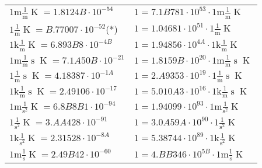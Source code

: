 \begin{center}
\begin{longtable}{l l}
{\color{gray}$1 \bm{\mathrm{ m}}\frac1{\operatorname{m}}{}{}{\operatorname{K}} = 1.8124B\cdot10^{-54} $}   & {\color{gray}$ 1 = 7.1B781\cdot10^{53} \cdot 1 \bm{\mathrm{ m}}\frac1{\operatorname{m}}{}{}{\operatorname{K}}$}  \\
{\color{black}$1 \bm{\mathrm{ }}\frac1{\operatorname{m}}{}{}{\operatorname{K}} = B.77007\cdot10^{-52} $}\quad(*) & {\color{black}$ 1 = 1.04681\cdot10^{51} \cdot 1 \bm{\mathrm{ }}\frac1{\operatorname{m}}{}{}{\operatorname{K}}$}  \\
{\color{gray}$1 \bm{\mathrm{ k}}\frac1{\operatorname{m}}{}{}{\operatorname{K}} = 6.893B8\cdot10^{-4B} $}   & {\color{gray}$ 1 = 1.94856\cdot10^{4A} \cdot 1 \bm{\mathrm{ k}}\frac1{\operatorname{m}}{}{}{\operatorname{K}}$}  \\
{\color{gray}$1 \bm{\mathrm{ m}}\frac1{\operatorname{m}}{\operatorname{s}}{}{\operatorname{K}} = 7.1A50B\cdot10^{-21} $}   & {\color{gray}$ 1 = 1.8159B\cdot10^{20} \cdot 1 \bm{\mathrm{ m}}\frac1{\operatorname{m}}{\operatorname{s}}{}{\operatorname{K}}$}  \\
{\color{black}$1 \bm{\mathrm{ }}\frac1{\operatorname{m}}{\operatorname{s}}{}{\operatorname{K}} = 4.18387\cdot10^{-1A} $}   & {\color{black}$ 1 = 2.A9353\cdot10^{19} \cdot 1 \bm{\mathrm{ }}\frac1{\operatorname{m}}{\operatorname{s}}{}{\operatorname{K}}$}  \\
{\color{gray}$1 \bm{\mathrm{ k}}\frac1{\operatorname{m}}{\operatorname{s}}{}{\operatorname{K}} = 2.49106\cdot10^{-17} $}   & {\color{gray}$ 1 = 5.010A3\cdot10^{16} \cdot 1 \bm{\mathrm{ k}}\frac1{\operatorname{m}}{\operatorname{s}}{}{\operatorname{K}}$}  \\
{\color{gray}$1 \bm{\mathrm{ m}}{}\frac1{\operatorname{s}^2}{}{\operatorname{K}} = 6.8B8B1\cdot10^{-94} $}   & {\color{gray}$ 1 = 1.94099\cdot10^{93} \cdot 1 \bm{\mathrm{ m}}{}\frac1{\operatorname{s}^2}{}{\operatorname{K}}$}  \\
{\color{black}$1 \bm{\mathrm{ }}{}\frac1{\operatorname{s}^2}{}{\operatorname{K}} = 3.AA428\cdot10^{-91} $}   & {\color{black}$ 1 = 3.0A59A\cdot10^{90} \cdot 1 \bm{\mathrm{ }}{}\frac1{\operatorname{s}^2}{}{\operatorname{K}}$}  \\
{\color{gray}$1 \bm{\mathrm{ k}}{}\frac1{\operatorname{s}^2}{}{\operatorname{K}} = 2.31528\cdot10^{-8A} $}   & {\color{gray}$ 1 = 5.38744\cdot10^{89} \cdot 1 \bm{\mathrm{ k}}{}\frac1{\operatorname{s}^2}{}{\operatorname{K}}$}  \\
{\color{gray}$1 \bm{\mathrm{ m}}{}\frac1{\operatorname{s}}{}{\operatorname{K}} = 2.49B42\cdot10^{-60} $}   & {\color{gray}$ 1 = 4.BB346\cdot10^{5B} \cdot 1 \bm{\mathrm{ m}}{}\frac1{\operatorname{s}}{}{\operatorname{K}}$}  \\

\end{longtable}
\end{center}
